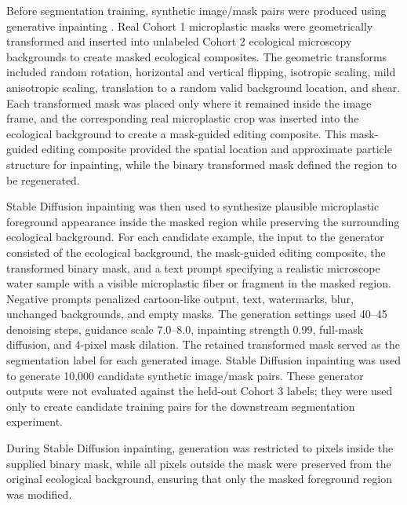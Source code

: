 \documentclass[11pt]{article}
\begin{document}
Before segmentation training, synthetic image/mask pairs were produced using generative inpainting \cite{13,14,15,16,17}. Real Cohort 1 microplastic masks were geometrically transformed and inserted into unlabeled Cohort 2 ecological microscopy backgrounds to create masked ecological composites. The geometric transforms included random rotation, horizontal and vertical flipping, isotropic scaling, mild anisotropic scaling, translation to a random valid background location, and shear. Each transformed mask was placed only where it remained inside the image frame, and the corresponding real microplastic crop was inserted into the ecological background to create a mask-guided editing composite. This mask-guided editing composite provided the spatial location and approximate particle structure for inpainting, while the binary transformed mask defined the region to be regenerated.

Stable Diffusion inpainting \cite{13,14,15} was then used to synthesize plausible microplastic foreground appearance inside the masked region while preserving the surrounding ecological background. For each candidate example, the input to the generator consisted of the ecological background, the mask-guided editing composite, the transformed binary mask, and a text prompt specifying a realistic microscope water sample with a visible microplastic fiber or fragment in the masked region. Negative prompts penalized cartoon-like output, text, watermarks, blur, unchanged backgrounds, and empty masks. The generation settings used 40--45 denoising steps, guidance scale 7.0--8.0, inpainting strength 0.99, full-mask diffusion, and 4-pixel mask dilation. The retained transformed mask served as the segmentation label for each generated image. Stable Diffusion inpainting was used to generate 10,000 candidate synthetic image/mask pairs. These generator outputs were not evaluated against the held-out Cohort 3 labels; they were used only to create candidate training pairs for the downstream segmentation experiment.

During Stable Diffusion inpainting, generation was restricted to pixels inside the supplied binary mask, while all pixels outside the mask were preserved from the original ecological background, ensuring that only the masked foreground region was modified.
\end{document}
